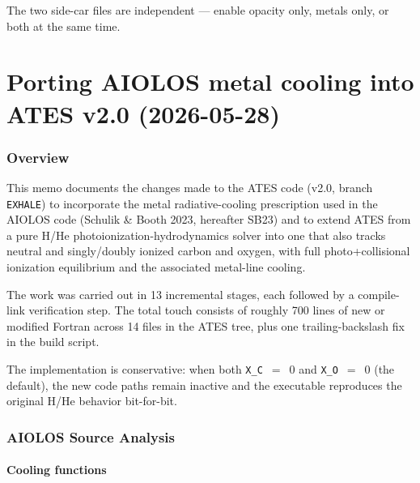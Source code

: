 \documentclass[english,a4paper]{my_memo}
\begin{document}
The two side-car files are independent --- enable opacity only, metals only,
or both at the same time.


\part{Porting AIOLOS metal cooling into ATES v2.0 (2026-05-28)}

\section{Overview}

This memo documents the changes made to the ATES code (v2.0, branch
\texttt{EXHALE}) to incorporate the metal radiative-cooling
prescription used in the AIOLOS code (Schulik \& Booth 2023, hereafter
SB23) and to extend ATES from a pure H/He photoionization-hydrodynamics
solver into one that also tracks neutral and singly/doubly ionized
carbon and oxygen, with full photo+collisional ionization equilibrium
and the associated metal-line cooling.

The work was carried out in 13 incremental stages, each followed by a
compile-link verification step.  The total touch consists of roughly
700 lines of new or modified Fortran across 14 files in the ATES tree,
plus one trailing-backslash fix in the build script.

The implementation is conservative: when both
\texttt{X\_C}~\(=\)~\(0\) and \texttt{X\_O}~\(=\)~\(0\) (the default),
the new code paths remain inactive and the executable reproduces the
original H/He behavior bit-for-bit.

\section{AIOLOS Source Analysis}

\subsection{Cooling functions}
\end{document}
